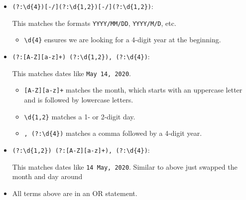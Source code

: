 \documentclass{article}
\begin{document}
\begin{itemize}
\begin{itemize}
            This matches the formats \texttt{MM/DD/YY}, \texttt{MM/DD/YYYY}, \texttt{M/D/YYYY}, etc.
            
            \begin{itemize}
                \item \verb|\d{1,2}| matches a 1- or 2-digit month and day.
                \item \verb|[-/]| matches either a dash (\verb|-|) or a slash (\verb|/|) as separators.
                \item \verb|\d{2,4}| matches either a 2-digit or 4-digit year.
            \end{itemize}
            
            \item \verb|(?:\d{4})[-/](?:\d{1,2})[-/](?:\d{1,2})|:
            
            This matches the formats \texttt{YYYY/MM/DD}, \texttt{YYYY/M/D}, etc.
            
            \begin{itemize}
                \item \verb|\d{4}| ensures we are looking for a 4-digit year at the beginning.
            \end{itemize}
            
            \item \verb|(?:[A-Z][a-z]+) (?:\d{1,2}), (?:\d{4})|:
            
            This matches dates like \texttt{May 14, 2020}.
            
            \begin{itemize}
                \item \verb|[A-Z][a-z]+| matches the month, which starts with an uppercase letter and is followed by lowercase letters.
                \item \verb|\d{1,2}| matches a 1- or 2-digit day.
                \item \verb|, (?:\d{4})| matches a comma followed by a 4-digit year.
            \end{itemize}
            
            \item \verb|(?:\d{1,2}) (?:[A-Z][a-z]+), (?:\d{4})|:
            
            This matches dates like \texttt{14 May, 2020}. Similar to above just swapped the month and day around

            \item All terms above are in an OR statement.
            
        \end{itemize}


\end{itemize}
\end{document}

